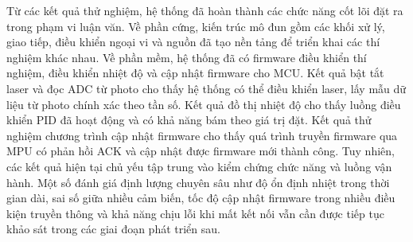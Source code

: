 Từ các kết quả thử nghiệm, hệ thống đã hoàn thành các chức năng cốt lõi đặt ra trong phạm vi luận văn. Về phần cứng, kiến trúc mô đun gồm các khối xử lý, giao tiếp, điều khiển ngoại vi và nguồn đã tạo nền tảng để triển khai các thí nghiệm khác nhau. Về phần mềm, hệ thống đã có firmware điều khiển thí nghiệm, điều khiển nhiệt độ và cập nhật firmware cho MCU.
Kết quả bật tắt laser và đọc ADC từ photo cho thấy hệ thống có thể điều khiển laser, lấy mẫu dữ liệu từ photo chính xác theo tần số. Kết quả đồ thị nhiệt độ cho thấy luồng điều khiển PID đã hoạt động và có khả năng bám theo giá trị đặt. Kết quả thử nghiệm chương trình cập nhật firmware cho thấy quá trình truyền firmware qua MPU có phản hồi ACK và cập nhật được firmware mới thành công.
Tuy nhiên, các kết quả hiện tại chủ yếu tập trung vào kiểm chứng chức năng và luồng vận hành. Một số đánh giá định lượng chuyên sâu như độ ổn định nhiệt trong thời gian dài, sai số giữa nhiều cảm biến, tốc độ cập nhật firmware trong nhiều điều kiện truyền thông và khả năng chịu lỗi khi mất kết nối vẫn cần được tiếp tục khảo sát trong các giai đoạn phát triển sau.

